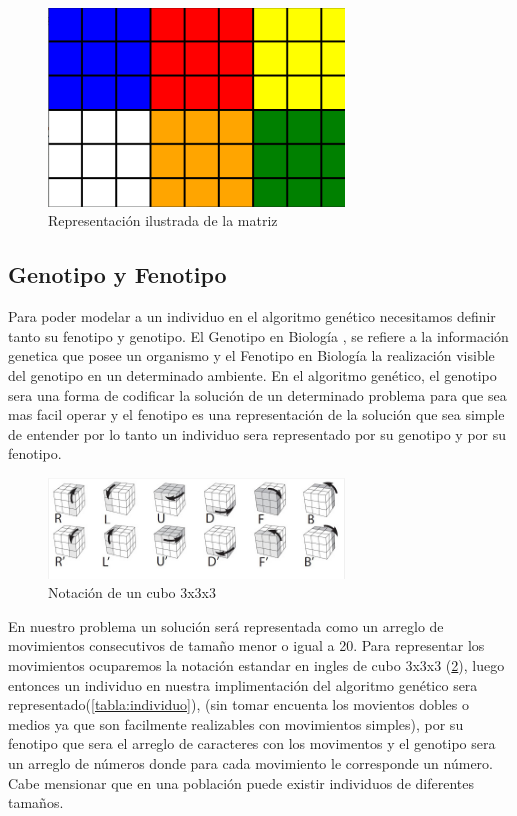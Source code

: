 \documentclass[oneside,10pt]{article}
\begin{document}
\begin{figure}
  \begin{center}
  \includegraphics[width=0.7\textwidth]{migrafico}
  \caption{Representaci\'on ilustrada de la matriz}
  \label{fig:ejemplo}
  \end{center}
\end{figure}

\subsection{Genotipo y Fenotipo}
Para poder modelar a un individuo en el algoritmo gen\'etico necesitamos definir tanto su fenotipo y genotipo.
El Genotipo en Biolog\'ia , se refiere a la informaci\'on genetica que posee un organismo y el Fenotipo en Biolog\'ia la realizaci\'on visible del genotipo en un determinado ambiente. En el algoritmo gen\'etico, el genotipo sera una forma de codificar la soluci\'on de un determinado problema para que sea mas facil operar y el fenotipo es una representaci\'on de la soluci\'on que sea simple de entender por lo tanto un individuo sera representado por su genotipo y por su fenotipo.\\

\begin{figure}
  \begin{center}
  \includegraphics[width=0.7\textwidth]{notacion}
  \caption{Notaci\'on de un cubo 3x3x3 }
  \label{fig:move}
  \end{center}
\end{figure}

En nuestro problema un soluci\'on ser\'a representada como un arreglo de movimientos consecutivos de tama\~no menor o igual a 20. Para representar los movimientos ocuparemos la notaci\'on estandar en ingles de cubo 3x3x3 (\ref{fig:move}), luego entonces un individuo en nuestra implimentaci\'on del algoritmo gen\'etico sera representado(\ref{tabla:individuo}), (sin tomar encuenta los movientos dobles o medios ya que son facilmente realizables con movimientos simples), por su fenotipo que sera el arreglo de caracteres con los movimentos y el genotipo sera un arreglo de n\'umeros donde para cada movimiento le corresponde un n\'umero. Cabe mensionar que en una poblaci\'on puede existir individuos de diferentes tama\~nos.
\end{document}
